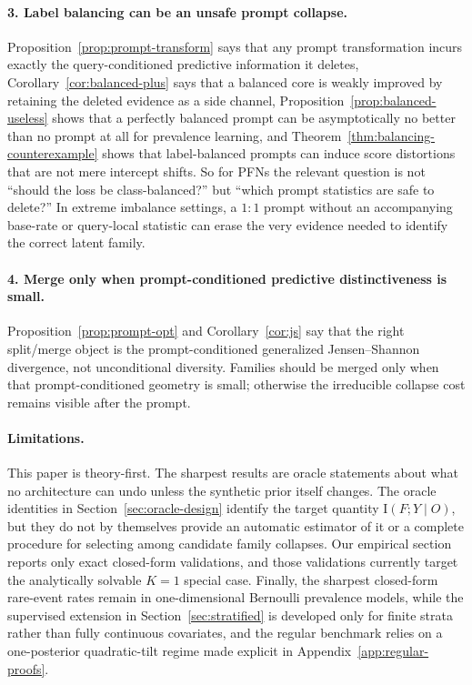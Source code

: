 \documentclass{article}
\theoremstyle{definition}
\theoremstyle{remark}
\newcommand{\I}{\mathrm{I}}
\begin{document}
\paragraph{3. Label balancing can be an unsafe prompt collapse.}
Proposition~\ref{prop:prompt-transform} says that any prompt transformation incurs exactly the query-conditioned predictive information it deletes, Corollary~\ref{cor:balanced-plus} says that a balanced core is weakly improved by retaining the deleted evidence as a side channel, Proposition~\ref{prop:balanced-useless} shows that a perfectly balanced prompt can be asymptotically no better than no prompt at all for prevalence learning, and Theorem~\ref{thm:balancing-counterexample} shows that label-balanced prompts can induce score distortions that are not mere intercept shifts. So for PFNs the relevant question is not ``should the loss be class-balanced?'' but ``which prompt statistics are safe to delete?'' In extreme imbalance settings, a $1{:}1$ prompt without an accompanying base-rate or query-local statistic can erase the very evidence needed to identify the correct latent family.

\paragraph{4. Merge only when prompt-conditioned predictive distinctiveness is small.}
Proposition~\ref{prop:prompt-opt} and Corollary~\ref{cor:js} say that the right split/merge object is the prompt-conditioned generalized Jensen--Shannon divergence, not unconditional diversity. Families should be merged only when that prompt-conditioned geometry is small; otherwise the irreducible collapse cost remains visible after the prompt.

\paragraph{Limitations.}

This paper is theory-first. The sharpest results are oracle statements about what no architecture can undo unless the synthetic prior itself changes. The oracle identities in Section~\ref{sec:oracle-design} identify the target quantity $\I(F;Y\mid O)$, but they do not by themselves provide an automatic estimator of it or a complete procedure for selecting among candidate family collapses. Our empirical section reports only exact closed-form validations, and those validations currently target the analytically solvable $K=1$ special case. Finally, the sharpest closed-form rare-event rates remain in one-dimensional Bernoulli prevalence models, while the supervised extension in Section~\ref{sec:stratified} is developed only for finite strata rather than fully continuous covariates, and the regular benchmark relies on a one-posterior quadratic-tilt regime made explicit in Appendix~\ref{app:regular-proofs}.
\end{document}
